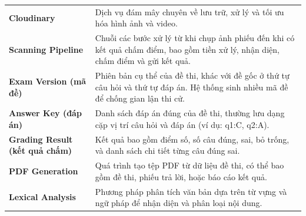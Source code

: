 \documentclass[../DoAn.tex]{subfiles}
\begin{document}
\begin{longtable}{l p{14cm}}
   \textbf{Cloudinary} & Dịch vụ đám mây chuyên về lưu trữ, xử lý và tối ưu hóa hình ảnh và video. \\
   \textbf{Scanning Pipeline} & Chuỗi các bước xử lý từ khi chụp ảnh phiếu đến khi có kết quả chấm điểm, bao gồm tiền xử lý, nhận diện, chấm điểm và gửi kết quả. \\
   \textbf{Exam Version (mã đề)} & Phiên bản cụ thể của đề thi, khác với đề gốc ở thứ tự câu hỏi và thứ tự đáp án. Hệ thống sinh nhiều mã đề để chống gian lận thi cử. \\
   \textbf{Answer Key (đáp án)} & Danh sách đáp án đúng của đề thi, thường lưu dạng cặp vị trí câu hỏi và đáp án (ví dụ: q1:C, q2:A). \\
   \textbf{Grading Result (kết quả chấm)} & Kết quả bao gồm điểm số, số câu đúng, sai, bỏ trống, và danh sách chi tiết từng câu đúng sai. \\
   \textbf{PDF Generation} & Quá trình tạo tệp PDF từ dữ liệu đề thi, có thể bao gồm đề thi, phiếu trả lời, hoặc báo cáo kết quả. \\
   \textbf{Lexical Analysis} & Phương pháp phân tích văn bản dựa trên từ vựng và ngữ pháp để nhận diện và phân loại nội dung. \\
    \hline
\end{longtable}
\end{document}
